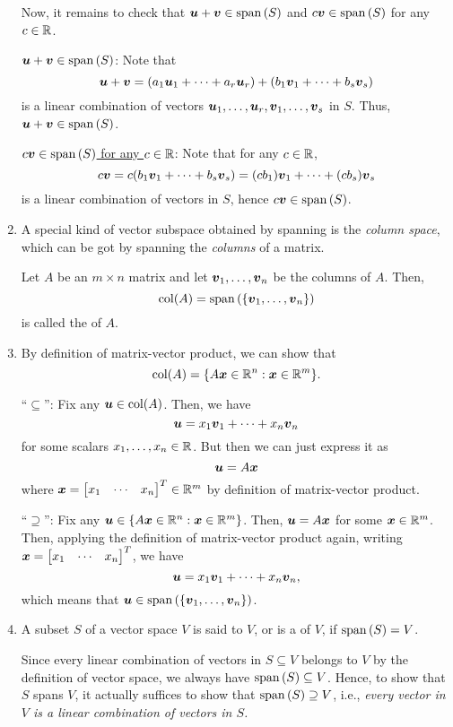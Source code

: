 \begin{enumerate}
\begin{pf}
Now, it remains to check that \(\vb*{u}+\vb*{v}\in\operatorname{span}\qty(S)\) and
\(c\vb*{v}\in\operatorname{span}\qty(S)\) for any \(c\in\mathbb{R}\).

\underline{\(\vb*{u}+\vb*{v}\in\operatorname{span}\qty(S)\)}: Note that
\[
\vb*{u}+\vb*{v}
=(a_1\vb*{u}_1+\dotsb+a_r\vb*{u}_r)+(b_1\vb*{v}_1+\dotsb+b_s\vb*{v}_s)
\]
is a linear combination of vectors
\(\vb*{u}_1,\dotsc,\vb*{u}_r,\vb*{v}_1,\dotsc,\vb*{v}_s\) in \(S\). Thus,
\(\vb*{u}+\vb*{v}\in\operatorname{span}\qty(S)\).

\underline{\(c\vb*{v}\in\operatorname{span}\qty(S)\) for any \(c\in\mathbb{R}\)}: Note that for any
\(c\in\mathbb{R}\),
\[
c\vb*{v}=c(b_1\vb*{v}_1+\dotsb+b_s\vb*{v}_s)
=(cb_1)\vb*{v}_1+\dotsb+(cb_s)\vb*{v}_s
\]
is a linear combination of vectors in \(S\), hence \(c\vb*{v}\in\operatorname{span}\qty(S)\).
\end{pf}
\item A special kind of vector subspace obtained by spanning is the
\emph{column space}, which can be got by spanning the \emph{columns} of a
matrix.

Let \(A\) be an \(m\times n\) matrix and let \(\vb*{v}_1,\dotsc,\vb*{v}_n\)
be the columns of \(A\). Then,
\[
\operatorname{col}(A)=\operatorname{span}\qty(\{\vb*{v}_1,\dotsc,\vb*{v}_n\})
\]
is called the  of \(A\).

\item\label{it:col-space-expr} By definition of matrix-vector product, we can
show that
\[
\operatorname{col}(A)=\{A\vb*{x}\in\mathbb{R}^n:\vb*{x}\in\mathbb{R}^m\}.
\]
\begin{pf}
``\(\subseteq\)'': Fix any \(\vb*{u}\in\operatorname{col}(A)\). Then, we have
\[
\vb*{u}=x_1\vb*{v}_1+\dotsb+x_n\vb*{v}_n
\]
for some scalars \(x_1,\dotsc,x_n\in\mathbb{R}\). But then we can just express it as
\[
\vb*{u}=A\vb*{x}
\]
where \(\vect{x}=\mqty[x_1&\cdots& x_n]^{T}\in\R^m\) by definition of matrix-vector product.

``\(\supseteq\)'': Fix any \(\vb*{u}\in\{A\vb*{x}\in\mathbb{R}^n:\vb*{x}\in\mathbb{R}^m\}\).
Then, \(\vb*{u}=A\vb*{x}\) for some \(\vb*{x}\in\mathbb{R}^m\). Then, applying the
definition of matrix-vector product again, writing
\(\vect{x}=\mqty[x_1&\cdots &x_n]^{T}\), we have
\[
\vb*{u}=x_1\vb*{v}_1+\dotsb+x_n\vb*{v}_n,
\]
which means that \(\vb*{u}\in\operatorname{span}\qty(\{\vb*{v}_1,\dotsc,\vb*{v}_n\})\).
\end{pf}
\item A subset \(S\) of a vector space \(V\) is said to  \(V\), or
is a  of \(V\), if \(\operatorname{span}\qty(S)=V\).

Since every linear combination of vectors in \(S\subseteq V\) belongs to \(V\)
by the definition of vector space, we always have \(\operatorname{span}\qty(S)\subseteq V\).
Hence, to show that \(S\) spans \(V\), it actually suffices to show that
\(\operatorname{span}\qty(S)\supseteq V\), i.e., \emph{every vector in \(V\) is a linear
combination of vectors in \(S\).}


\end{enumerate}
